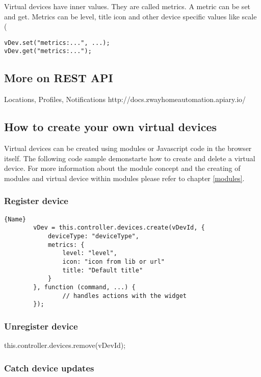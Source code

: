 Virtual devices have inner values. They are called metrics. A metric can be set and get. 
Metrics can be level, title icon and other device specific values like scale (%


\begin{lstlisting}
vDev.set("metrics:...", ...);  
vDev.get("metrics:...");
\end{lstlisting}

\subsection{More on REST API}

Locations, Profiles, Notifications
http://docs.zwayhomeautomation.apiary.io/
  
\subsection{How to create your own virtual devices}


Virtual devices can be created using modules or Javascript code in the browser itself. 
The following code sample demonstarte how to create and delete a virtual device. For more 
information about the module concept and the creating of modules and virtual device within 
modules please refer to chapter \ref{modules}.

\subsubsection{Register device}

\begin{lstlisting}[caption=Register Device]{Name} 
        vDev = this.controller.devices.create(vDevId, {
            deviceType: "deviceType",
            metrics: {
                level: "level",
                icon: "icon from lib or url"
                title: "Default title"
            }
        }, function (command, ...) {
                // handles actions with the widget
        });  
\end{lstlisting}

\subsubsection{Unregister device}

this.controller.devices.remove(vDevId);

 
\subsubsection{Catch device updates}


